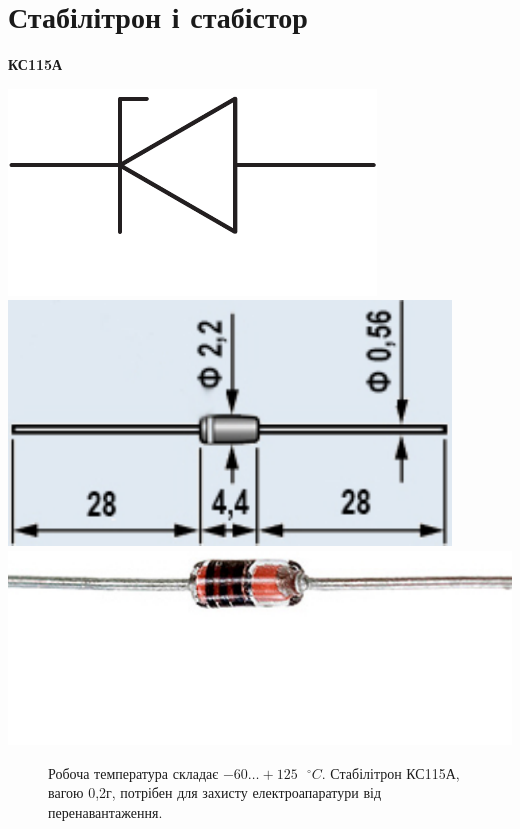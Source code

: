 \documentclass[a4paper,14pt]{extreport}
\begin{document}
\section{Стабілітрон і стабістор}
\begin{tcolorbox}[colback=white!100,colframe=red!75!black,width=19cm,righttitle=0.5cm,subtitle style={boxrule=0.4pt, colback=yellow!50!red!25!white},title= \bf{Графічне позначення}\hfill  \bf{Натуральне зоображення}]
  \begin{center}\bf{КС115А}\end{center}
  \tcblower
  \includegraphics[scale=0.5]{1.3.23.pdf}\hfill \includegraphics[scale=0.7]{1.3.22.pdf} \hfill\includegraphics[scale=0.4]{1.3.24.pdf}
\end{tcolorbox}
\begin{figure}
\vspace{-0.7 cm}
\parbox{12cm}{%
  \begin{tcolorbox}[width=12cm,right=0.5cm]
  Робоча температура складає $-60\ldots+125 \text{ }^{ \circ}C$.
  Стабілітрон КС115А, вагою 0,2г, потрібен для захисту електроапаратури від перенавантаження.
  \end{tcolorbox}}
\end{figure}
\end{document}
